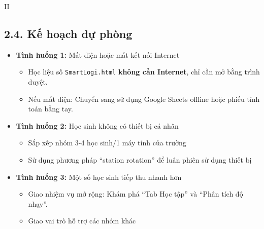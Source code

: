 \documentclass[12pt,a4paper]{article}
\begin{document}
\begin{competitionsection}{II}
\subsection*{2.4. Kế hoạch dự phòng}
\begin{itemize}[leftmargin=*,noitemsep]
\item \textbf{Tình huống 1:} Mất điện hoặc mất kết nối Internet
    \begin{itemize}
    \item Học liệu số \texttt{SmartLogi.html} \textbf{không cần Internet}, chỉ cần mở bằng trình duyệt.
    \item Nếu mất điện: Chuyển sang sử dụng Google Sheets offline hoặc phiếu tính toán bằng tay.
    \end{itemize}
\item \textbf{Tình huống 2:} Học sinh không có thiết bị cá nhân
    \begin{itemize}
    \item Sắp xếp nhóm 3-4 học sinh/1 máy tính của trường
    \item Sử dụng phương pháp ``station rotation'' để luân phiên sử dụng thiết bị
    \end{itemize}
\item \textbf{Tình huống 3:} Một số học sinh tiếp thu nhanh hơn
    \begin{itemize}
    \item Giao nhiệm vụ mở rộng: Khám phá ``Tab Học tập'' và ``Phân tích độ nhạy''.
    \item Giao vai trò hỗ trợ các nhóm khác
    \end{itemize}
\end{itemize}
\end{competitionsection}
\end{document}

